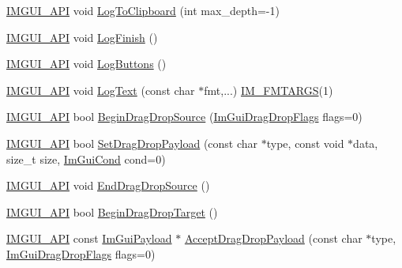 \begin{DoxyCompactItemize}
\item 
\mbox{\hyperlink{imgui_8h_a43829975e84e45d1149597467a14bbf5}{I\+M\+G\+U\+I\+\_\+\+A\+PI}} void \mbox{\hyperlink{namespace_im_gui_a81add991d176834b8a6e315dfc78e4f7}{Log\+To\+Clipboard}} (int max\+\_\+depth=-\/1)
\item 
\mbox{\hyperlink{imgui_8h_a43829975e84e45d1149597467a14bbf5}{I\+M\+G\+U\+I\+\_\+\+A\+PI}} void \mbox{\hyperlink{namespace_im_gui_a2ebcd048d1ca025fb972e1c2e920e3f3}{Log\+Finish}} ()
\item 
\mbox{\hyperlink{imgui_8h_a43829975e84e45d1149597467a14bbf5}{I\+M\+G\+U\+I\+\_\+\+A\+PI}} void \mbox{\hyperlink{namespace_im_gui_a7bd295da4be19bab98262c76fcaeb4fb}{Log\+Buttons}} ()
\item 
\mbox{\hyperlink{imgui_8h_a43829975e84e45d1149597467a14bbf5}{I\+M\+G\+U\+I\+\_\+\+A\+PI}} void \mbox{\hyperlink{namespace_im_gui_aa548475d8f771ab6524d73d900a41198}{Log\+Text}} (const char $\ast$fmt,...) \mbox{\hyperlink{imgui_8h_a1251c2f9ddac0873dbad8181bd82c9f1}{I\+M\+\_\+\+F\+M\+T\+A\+R\+GS}}(1)
\item 
\mbox{\hyperlink{imgui_8h_a43829975e84e45d1149597467a14bbf5}{I\+M\+G\+U\+I\+\_\+\+A\+PI}} bool \mbox{\hyperlink{namespace_im_gui_ac2609b0f034d3bcd8d70d26df8694eaa}{Begin\+Drag\+Drop\+Source}} (\mbox{\hyperlink{imgui_8h_a4e54f95ded29d2584125d116df22e430}{Im\+Gui\+Drag\+Drop\+Flags}} flags=0)
\item 
\mbox{\hyperlink{imgui_8h_a43829975e84e45d1149597467a14bbf5}{I\+M\+G\+U\+I\+\_\+\+A\+PI}} bool \mbox{\hyperlink{namespace_im_gui_adc77aecd872e578e347d8bc0dfcfa663}{Set\+Drag\+Drop\+Payload}} (const char $\ast$type, const void $\ast$data, size\+\_\+t size, \mbox{\hyperlink{imgui_8h_aef890d6ac872e12c5804d0b3e4f7f103}{Im\+Gui\+Cond}} cond=0)
\item 
\mbox{\hyperlink{imgui_8h_a43829975e84e45d1149597467a14bbf5}{I\+M\+G\+U\+I\+\_\+\+A\+PI}} void \mbox{\hyperlink{namespace_im_gui_a02f225fefff2a046038ed99ab20606da}{End\+Drag\+Drop\+Source}} ()
\item 
\mbox{\hyperlink{imgui_8h_a43829975e84e45d1149597467a14bbf5}{I\+M\+G\+U\+I\+\_\+\+A\+PI}} bool \mbox{\hyperlink{namespace_im_gui_ac42384c3181406bbd0f3f4f77a73c7ed}{Begin\+Drag\+Drop\+Target}} ()
\item 
\mbox{\hyperlink{imgui_8h_a43829975e84e45d1149597467a14bbf5}{I\+M\+G\+U\+I\+\_\+\+A\+PI}} const \mbox{\hyperlink{struct_im_gui_payload}{Im\+Gui\+Payload}} $\ast$ \mbox{\hyperlink{namespace_im_gui_a5e0dac39e249bf50e2ae96dc4a97cb18}{Accept\+Drag\+Drop\+Payload}} (const char $\ast$type, \mbox{\hyperlink{imgui_8h_a4e54f95ded29d2584125d116df22e430}{Im\+Gui\+Drag\+Drop\+Flags}} flags=0)

\end{DoxyCompactItemize}
